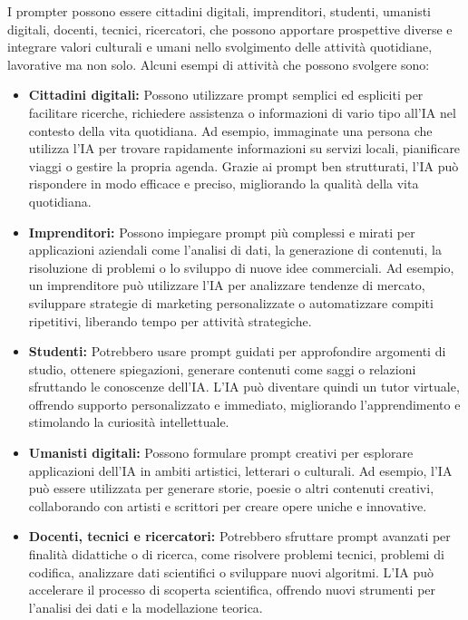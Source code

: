    I prompter possono essere cittadini digitali, imprenditori, studenti, umanisti digitali, docenti, tecnici, ricercatori, che possono apportare prospettive diverse e integrare valori culturali e umani nello svolgimento delle attività quotidiane, lavorative ma non solo. Alcuni esempi di attività che possono svolgere sono:
    \begin{itemize}
        \item \textbf{Cittadini digitali:} Possono utilizzare prompt semplici ed espliciti per facilitare ricerche, richiedere assistenza o informazioni di vario tipo all'IA nel contesto della vita quotidiana. Ad esempio, immaginate una persona che utilizza l'IA per trovare rapidamente informazioni su servizi locali, pianificare viaggi o gestire la propria agenda. Grazie ai prompt ben strutturati, l'IA può rispondere in modo efficace e preciso, migliorando la qualità della vita quotidiana. 

        \item \textbf{Imprenditori:} Possono impiegare prompt più complessi e mirati per applicazioni aziendali come l'analisi di dati, la generazione di contenuti, la risoluzione di problemi o lo sviluppo di nuove idee commerciali. Ad esempio, un imprenditore può utilizzare l'IA per analizzare tendenze di mercato, sviluppare strategie di marketing personalizzate o automatizzare compiti ripetitivi, liberando tempo per attività strategiche. 

        \item \textbf{Studenti:} Potrebbero usare prompt guidati per approfondire argomenti di studio, ottenere spiegazioni, generare contenuti come saggi o relazioni sfruttando le conoscenze dell'IA. L'IA può diventare quindi un tutor virtuale, offrendo supporto personalizzato e immediato, migliorando l'apprendimento e stimolando la curiosità intellettuale. 

        \item \textbf{Umanisti digitali:} Possono formulare prompt creativi per esplorare applicazioni dell'IA in ambiti artistici, letterari o culturali. Ad esempio, l'IA può essere utilizzata per generare storie, poesie o altri contenuti creativi, collaborando con artisti e scrittori per creare opere uniche e innovative. 

        \item \textbf{Docenti, tecnici e ricercatori:} Potrebbero sfruttare prompt avanzati per finalità didattiche o di ricerca, come risolvere problemi tecnici, problemi di codifica, analizzare dati scientifici o sviluppare nuovi algoritmi. L'IA può accelerare il processo di scoperta scientifica, offrendo nuovi strumenti per l'analisi dei dati e la modellazione teorica. 
    \end{itemize}

